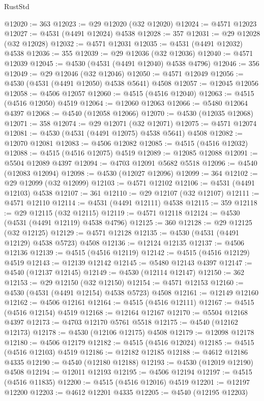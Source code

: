 \begin{lexlean}{RustStd}
\begin{coremodule}
{\begin{coremodule}
{{{{{{{{{{{{{{{{{{{{{{{{{{{{{{{{{{{{{{{{{{{{{{{{{{{{{{{@12020 := 363
@12023 := @29 @12020 (@32 @12020)
@12024 := @4571 @12023
@12027 := @4531 (@4491 @12024) @4538
@12028 := 357
@12031 := @29 @12028 (@32 @12028)
@12032 := @4571 @12031
@12035 := @4531 (@4491 @12032) @4538
@12036 := 355
@12039 := @29 @12036 (@32 @12036)
@12040 := @4571 @12039
@12045 := @4530 (@4531 (@4491 @12040) @4538 @4796)
@12046 := 356
@12049 := @29 @12046 (@32 @12046)
@12050 := @4571 @12049
@12056 := @4530 (@4531 (@4491 @12050) @4538 @5641) @4508
@12057 := @12045 @12056
@12058 := @4506 @12057
@12060 := @4515 (@4516 @12040)
@12063 := @4515 (@4516 @12050) @4519
@12064 := @12060 @12063
@12066 := @5480 @12064 @4397
@12068 := @4540 (@12058 @12066)
@12070 := @4530 (@12035 @12068)
@12071 := 358
@12074 := @29 @12071 (@32 @12071)
@12075 := @4571 @12074
@12081 := @4530 (@4531 (@4491 @12075) @4538 @5641) @4508
@12082 := @12070 @12081
@12083 := @4506 @12082
@12085 := @4515 (@4516 @12032)
@12088 := @4515 (@4516 @12075) @4519
@12089 := @12085 @12088
@12091 := @5504 @12089 @4397
@12094 := @4703 @12091 @5682 @5518
@12096 := @4540 (@12083 @12094)
@12098 := @4530 (@12027 @12096)
@12099 := 364
@12102 := @29 @12099 (@32 @12099)
@12103 := @4571 @12102
@12106 := @4531 (@4491 @12103) @4538
@12107 := 361
@12110 := @29 @12107 (@32 @12107)
@12111 := @4571 @12110
@12114 := @4531 (@4491 @12111) @4538
@12115 := 359
@12118 := @29 @12115 (@32 @12115)
@12119 := @4571 @12118
@12124 := @4530 (@4531 (@4491 @12119) @4538 @4796)
@12125 := 360
@12128 := @29 @12125 (@32 @12125)
@12129 := @4571 @12128
@12135 := @4530 (@4531 (@4491 @12129) @4538 @5723) @4508
@12136 := @12124 @12135
@12137 := @4506 @12136
@12139 := @4515 (@4516 @12119)
@12142 := @4515 (@4516 @12129) @4519
@12143 := @12139 @12142
@12145 := @5480 @12143 @4397
@12147 := @4540 (@12137 @12145)
@12149 := @4530 (@12114 @12147)
@12150 := 362
@12153 := @29 @12150 (@32 @12150)
@12154 := @4571 @12153
@12160 := @4530 (@4531 (@4491 @12154) @4538 @5723) @4508
@12161 := @12149 @12160
@12162 := @4506 @12161
@12164 := @4515 (@4516 @12111)
@12167 := @4515 (@4516 @12154) @4519
@12168 := @12164 @12167
@12170 := @5504 @12168 @4397
@12173 := @4703 @12170 @5761 @5518
@12175 := @4540 (@12162 @12173)
@12178 := @4530 (@12106 @12175) @4508
@12179 := @12098 @12178
@12180 := @4506 @12179
@12182 := @4515 (@4516 @12024)
@12185 := @4515 (@4516 @12103) @4519
@12186 := @12182 @12185
@12188 := @4612 @12186 @4335
@12190 := @4540 (@12180 @12188)
@12193 := @4530 (@12019 @12190) @4508
@12194 := @12011 @12193
@12195 := @4506 @12194
@12197 := @4515 (@4516 @11835)
@12200 := @4515 (@4516 @12016) @4519
@12201 := @12197 @12200
@12203 := @4612 @12201 @4335
@12205 := @4540 (@12195 @12203)
}}}}}}}}}}}}}}}}}}}}}}}}}}}}}}}}}}}}}}}}}}}}}}}}}}}}}}}
\end{coremodule}}
\end{coremodule}
\end{lexlean}
